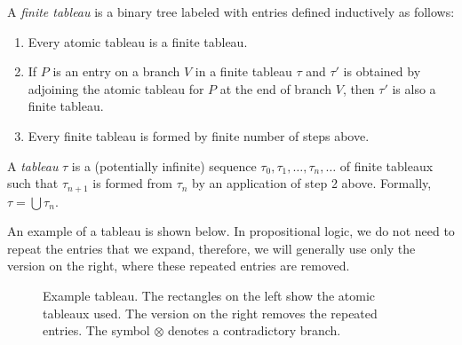 \begin{definition}
A \emph{finite tableau} is a binary tree labeled with entries defined inductively as follows:
\begin{enumerate}
	\item Every atomic tableau is a finite tableau.
  \item If $P$ is an entry on a branch $V$ in a finite tableau $\tau$ and $\tau'$ is obtained by adjoining the atomic tableau for $P$ at the end of branch $V$, then $\tau'$ is also a finite tableau.
  \item Every finite tableau is formed by finite number of steps above.
\end{enumerate}

A \emph{tableau} $\tau$ is a (potentially infinite) sequence $\tau_0, \tau_1, \dots, \tau_n, \dots$  of finite tableaux such that $\tau_{n+1}$ is formed from $\tau_n$ by an application of step 2 above. Formally, $\tau = \bigcup \tau_n$.
\end{definition}

An example of a tableau is shown below. In propositional logic, we do not need to repeat the entries that we expand, therefore, we will generally use only the version on the right, where these repeated entries are removed.

\begin{figure}[ht]
\begin{minipage}{0.5\textwidth}
\centering
{}
\end{minipage}
\begin{minipage}{0.5\textwidth}
\centering
{}
\end{minipage}
\caption{Example tableau. The rectangles on the left show the atomic tableaux used. The version on the right removes the repeated entries. The symbol $\otimes$ denotes a contradictory branch.}
\label{fig:tableau_notation_proof}
\end{figure}

